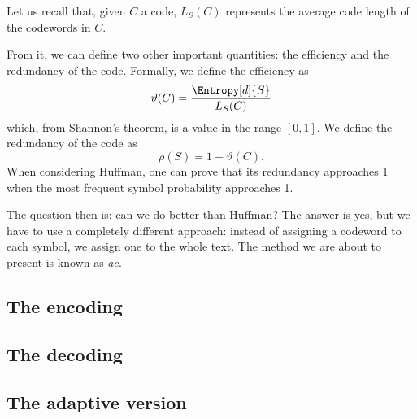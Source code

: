 \documentclass{subfiles}
\begin{document}
    Let us recall that, given \(C\) a code, 
        \(L_{S}(C)\) represents the average code length of the codewords in \(C\).

    From it, we can define two other important quantities: 
        the efficiency and the redundancy of the code.
        Formally, we define the efficiency as 
        \[
            \vartheta(C) = \frac{\Entropy[d]{S}}{L_{S}(C)}
        \]
        which, from Shannon's theorem, is a value in the range \([0, 1]\).
        We define the redundancy of the code as 
        \[
            \rho(S) = 1 - \vartheta(C)\text{.}
        \]
        When considering Huffman, 
            one can prove that its redundancy approaches 1 when the most 
            frequent symbol probability approaches 1.

        The question then is: can we do better than Huffman?
            The answer is yes, but we have to use a completely different approach:
            instead of assigning a codeword to each symbol, 
            we assign one to the whole text.
            The method we are about to present is known as \emph{\gls{ac}}.

        \subsection{The encoding}
        

        \subsection{The decoding}
        

        \subsection{The adaptive version}
        
\end{document}
